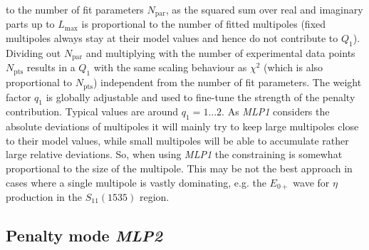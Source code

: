\documentclass[a4paper,10pt]{article}
\begin{document}
to the number of fit parameters $N_\mathrm{par}$, as the squared sum over real and imaginary parts up to $L_\mathrm{max}$
is proportional to the number of fitted multipoles (fixed multipoles always stay at their model values and hence do not
contribute to $Q_1$). Dividing out $N_\mathrm{par}$ and multiplying with the number of experimental data points
$N_\mathrm{pts}$ results in a $Q_1$ with the same scaling behaviour as $\chi^2$ (which is also proportional to $N_\mathrm{pts}$)
independent from the number of fit parameters.
The weight factor $q_1$ is globally adjustable and used to fine-tune the strength of the penalty contribution. Typical
values are around $q_1 = 1...2$.
As \textit{MLP1} considers the absolute deviations of multipoles it will mainly try to keep large multipoles close to their model values,
while small multipoles will be able to accumulate rather large relative deviations. So, when using \textit{MLP1} the
constraining is somewhat proportional to the size of the multipole. This may be not the best approach in cases where a single multipole
is vastly dominating, e.g. the $E_{0+}$ wave for $\eta$ production in the $S_{11}(1535)$ region.

\subsection{Penalty mode \textit{MLP2}}
\end{document}
